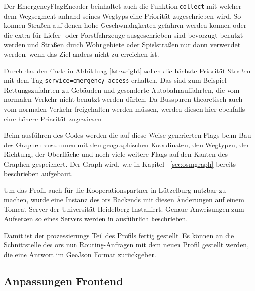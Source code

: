 Der EmergencyFlagEncoder beinhaltet auch die Funktion \texttt{collect} mit welcher dem Wegsegment anhand seines Wegtyps eine Priorität zugeschrieben wird.
So können Straßen auf denen hohe Geschwindigkeiten gefahren werden können oder die extra für Liefer- oder Forstfahrzeuge ausgeschrieben sind bevorzugt benutzt werden und Straßen durch Wohngebiete oder Spielstraßen nur dann verwendet werden, wenn das Ziel anders nicht zu erreichen ist.


Durch das den Code in Abbildung \ref{lst:weight} sollen die höchste Priorität Straßen mit dem Tag \texttt{service=emergency\_access} erhalten.
Das sind zum Beispiel Rettungszufahrten zu Gebäuden und gesonderte Autobahnauffahrten, die vom normalen Verkehr nicht benutzt werden dürfen.
Da Busspuren theoretisch auch vom normalen Verkehr freigehalten werden müssen, werden diesen hier ebenfalls eine höhere Priorität zugewiesen.

Beim ausführen des Codes werden die auf diese Weise generierten Flags beim Bau des Graphen zusammen mit den geographischen Koordinaten, den Wegtypen, der Richtung, der Oberfläche und noch viele weitere Flags auf den Kanten des Graphen gespeichert.
Der Graph wird, wie in Kapitel ~\ref{sec:osmgraph} bereits beschrieben aufgebaut.

Um das Profil auch für die Kooperationspartner in Lützelburg nutzbar zu machen, wurde eine Instanz des \gls{ors} Backends mit diesen Änderungen auf einem Tomcat Server der Universität Heidelberg Installiert.
Genaue Anweisungen zum Aufsetzen so eines Servers werden in \cite{neisdoktor} ausführlich beschrieben.

Damit ist der prozessierungs Teil des Profils fertig gestellt.
Es können an die Schnittstelle des \gls{ors} nun Routing-Anfragen mit dem neuen Profil gestellt werden, die eine Antwort im GeoJson Format zurückgeben.

%
%
%
%

\subsection{Anpassungen Frontend}

